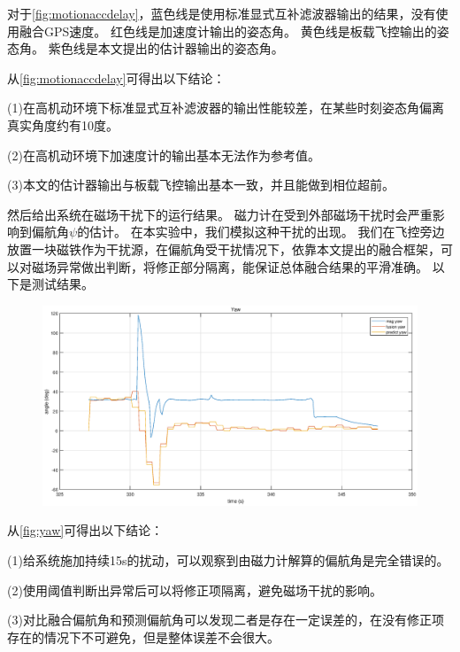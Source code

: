 \documentclass[
  type=master
]{gdutthesis}
\begin{document}
对于\autoref{fig:motionaccdelay}，蓝色线是使用标准显式互补滤波器输出的结果，没有使用融合GPS速度。
红色线是加速度计输出的姿态角。
黄色线是板载飞控输出的姿态角。
紫色线是本文提出的估计器输出的姿态角。

从\autoref{fig:motionaccdelay}可得出以下结论：

(1)在高机动环境下标准显式互补滤波器的输出性能较差，在某些时刻姿态角偏离真实角度约有10度。

(2)在高机动环境下加速度计的输出基本无法作为参考值。

(3)本文的估计器输出与板载飞控输出基本一致，并且能做到相位超前。

然后给出系统在磁场干扰下的运行结果。
磁力计在受到外部磁场干扰时会严重影响到偏航角$\psi$的估计。
在本实验中，我们模拟这种干扰的出现。
我们在飞控旁边放置一块磁铁作为干扰源，在偏航角受干扰情况下，依靠本文提出的融合框架，可以对磁场异常做出判断，将修正部分隔离，能保证总体融合结果的平滑准确。
以下是测试结果。
\begin{figure}[H]
	\centering
	\includegraphics[width=1.0\textwidth]{yaw.eps}
	\label{fig:yaw}
\end{figure}

从\autoref{fig:yaw}可得出以下结论：

(1)给系统施加持续15s的扰动，可以观察到由磁力计解算的偏航角是完全错误的。

(2)使用阈值判断出异常后可以将修正项隔离，避免磁场干扰的影响。

(3)对比融合偏航角和预测偏航角可以发现二者是存在一定误差的，在没有修正项存在的情况下不可避免，但是整体误差不会很大。
\end{document}
